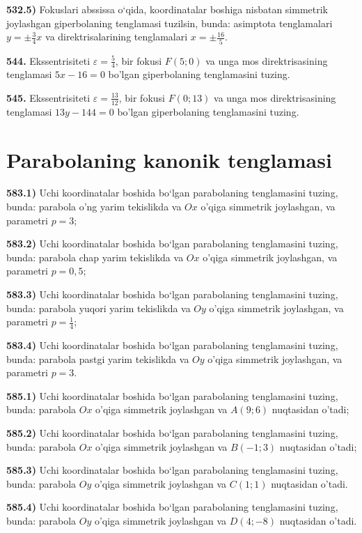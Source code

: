 \textbf{532.5)} Fokuslari abssissa o‘qida, koordinatalar boshiga nisbatan simmetrik joylashgan giperbolaning tenglamasi tuzilsin, bunda: asimptota tenglamalari $y= \pm \frac{3}{4} x$ va direktrisalarining tenglamalari $x= \pm \frac{16}{5}$.

\textbf{544.} Ekssentrisiteti $\varepsilon=\frac{5}{4}$, bir fokusi $F(5 ; 0)$ va unga mos direktrisasining tenglamasi $5 x-16=0$ bo'lgan giperbolaning tenglamasini tuzing.

\textbf{545.} Ekssentrisiteti $\varepsilon=\frac{13}{12}$, bir fokusi $F(0 ; 13)$ va unga mos direktrisasining tenglamasi $13 y-144=0$ bo'lgan giperbolaning tenglamasini tuzing.



\section{Parabolaning kanonik tenglamasi}



\textbf{583.1)} Uchi koordinatalar boshida bo‘lgan parabolaning tenglamasini tuzing, bunda: parabola o'ng yarim tekislikda va $Ox$ o'qiga simmetrik joylashgan, va parametri $p=3$;

\textbf{583.2)} Uchi koordinatalar boshida bo‘lgan parabolaning tenglamasini tuzing, bunda: parabola chap yarim tekislikda va $Ox$ o'qiga simmetrik joylashgan, va parametri $p=0,5$;

\textbf{583.3)} Uchi koordinatalar boshida bo‘lgan parabolaning tenglamasini tuzing, bunda: parabola yuqori yarim tekislikda va $Oy$ o'qiga simmetrik joylashgan, va parametri $p=\frac{1}{4}$;

\textbf{583.4)} Uchi koordinatalar boshida bo‘lgan parabolaning tenglamasini tuzing, bunda: parabola pastgi yarim tekislikda va $Oy$ o'qiga simmetrik joylashgan, va parametri $p=3$.

\textbf{585.1)} Uchi koordinatalar boshida bo‘lgan parabolaning tenglamasini tuzing, bunda: parabola $Ox$ o'qiga simmetrik joylashgan va $A(9 ; 6)$ nuqtasidan o'tadi;

\textbf{585.2)} Uchi koordinatalar boshida bo‘lgan parabolaning tenglamasini tuzing, bunda: parabola $Ox$ o'qiga simmetrik joylashgan va $B(-1 ; 3)$ nuqtasidan o'tadi;

\textbf{585.3)} Uchi koordinatalar boshida bo‘lgan parabolaning tenglamasini tuzing, bunda: parabola $Oy$ o'qiga simmetrik joylashgan va $C(1 ; 1)$ nuqtasidan o’tadi.

\textbf{585.4)} Uchi koordinatalar boshida bo‘lgan parabolaning tenglamasini tuzing, bunda: parabola $Oy$ o'qiga simmetrik joylashgan va $D(4 ;-8)$ nuqtasidan o’tadi.

